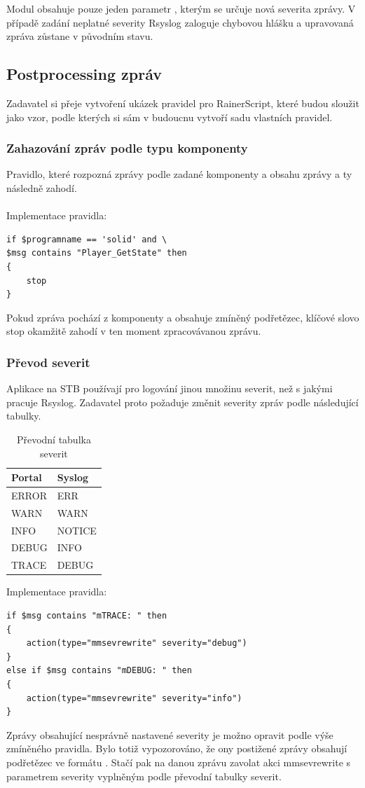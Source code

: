 \documentclass[thesis=B,czech]{FITthesis}[2012/06/26]
\begin{document}
Modul obsahuje pouze jeden parametr , kterým se určuje nová severita zprávy. V případě zadání neplatné severity Rsyslog zaloguje chybovou hlášku a upravovaná zpráva zůstane v původním stavu.

\subsection{Postprocessing zpráv}
Zadavatel si přeje vytvoření ukázek pravidel pro RainerScript, které budou sloužit jako vzor, podle kterých si sám v budoucnu vytvoří sadu vlastních pravidel.

\subsubsection{Zahazování zpráv podle typu komponenty}
Pravidlo, které rozpozná zprávy podle zadané komponenty a obsahu zprávy a ty následně zahodí.
\\
\\
Implementace pravidla:
\begin{lstlisting}
if $programname == 'solid' and \
$msg contains "Player_GetState" then
{	
	stop
}
\end{lstlisting}
Pokud zpráva pochází z komponenty  a obsahuje zmíněný podřetězec, klíčové slovo stop okamžitě zahodí v ten moment zpracovávanou zprávu.
\\
\subsubsection{Převod severit}
Aplikace na STB používají pro logování jinou množinu severit, než s jakými pracuje Rsyslog. Zadavatel proto požaduje změnit severity zpráv podle následující tabulky.

\begin{table}[H]
\centering
	\caption{Převodní tabulka severit}	\begin{tabular}{|l|l|}\hline
		Portal		& Syslog			\tabularnewline \hline \hline
		ERROR		& ERR			\tabularnewline \hline
		WARN		& WARN			\tabularnewline \hline
		INFO		& NOTICE			\tabularnewline \hline
		DEBUG		& INFO			\tabularnewline \hline
		TRACE		& DEBUG			\tabularnewline \hline
	\end{tabular}
\end{table}

Implementace pravidla:
\begin{lstlisting}
if $msg contains "mTRACE: " then
{
	action(type="mmsevrewrite" severity="debug")
}
else if $msg contains "mDEBUG: " then
{
	action(type="mmsevrewrite" severity="info")
}
\end{lstlisting}
Zprávy obsahující nesprávně nastavené severity je možno opravit podle výše zmíněného pravidla. Bylo totiž vypozorováno, že ony postižené zprávy obsahují podřetězec ve formátu . Stačí pak na danou zprávu zavolat akci mmsevrewrite s parametrem severity vyplněným podle převodní tabulky severit.
\end{document}

